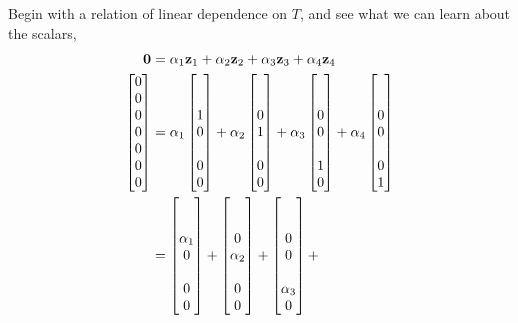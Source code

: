 \documentclass{ximera}
\begin{document}
\begin{example}
  Begin with a relation of linear dependence on $T$, and see what we
  can learn about the scalars,
  \begin{align*}
    \zerovector&=\alpha_1\vect{z}_1+\alpha_2\vect{z}_2+\alpha_3\vect{z}_3+\alpha_4\vect{z}_4\\
    \colvector{0\\0\\0\\0\\0\\0\\0}
               &=
                 \alpha_1\colvector{ \\ \\1\\0\\ \\0\\0}+
                 \alpha_2\colvector{ \\ \\0\\1\\ \\0\\0}+
                 \alpha_3\colvector{ \\ \\0\\0\\ \\1\\0}+
                 \alpha_4\colvector{ \\ \\0\\0\\ \\0\\1}\\
               &=
                 \colvector{ \\ \\\alpha_1\\0\\ \\0\\0}+
                 \colvector{ \\ \\0\\\alpha_2\\ \\0\\0}+
                 \colvector{ \\ \\0\\0\\ \\\alpha_3\\0}+

\end{align*}
\end{example}
\end{document}
